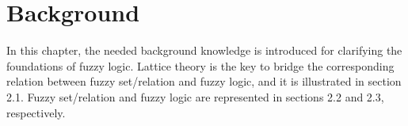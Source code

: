 \documentclass[Thesis.tex]{subfiles}
\begin{document}
\chapter{Background}
\label{chap:Background}
In this chapter, the needed background knowledge is introduced for clarifying the foundations of fuzzy logic. Lattice theory \cite{DP03} is the key to bridge the corresponding relation between fuzzy set/relation and fuzzy logic, and it is illustrated in section 2.1. Fuzzy set/relation and fuzzy logic are represented in sections 2.2 and 2.3, respectively.




 

\end{document}
